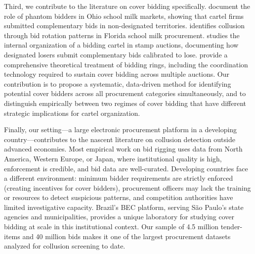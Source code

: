 Third, we contribute to the literature on cover bidding specifically. \citet{porter1999ohio} document the role of phantom bidders in Ohio school milk markets, showing that cartel firms submitted complementary bids in non-designated territories. \citet{pesendorfer2000study} identifies collusion through bid rotation patterns in Florida school milk procurement. \citet{asker2010leniency} studies the internal organization of a bidding cartel in stamp auctions, documenting how designated losers submit complementary bids calibrated to lose. \citet{marshall2012economics} provide a comprehensive theoretical treatment of bidding rings, including the coordination technology required to sustain cover bidding across multiple auctions. Our contribution is to propose a systematic, data-driven method for identifying potential cover bidders across all procurement categories simultaneously, and to distinguish empirically between two regimes of cover bidding that have different strategic implications for cartel organization.

Finally, our setting---a large electronic procurement platform in a developing country---contributes to the nascent literature on collusion detection outside advanced economies. Most empirical work on bid rigging uses data from North America, Western Europe, or Japan, where institutional quality is high, enforcement is credible, and bid data are well-curated. Developing countries face a different environment: minimum bidder requirements are strictly enforced (creating incentives for cover bidders), procurement officers may lack the training or resources to detect suspicious patterns, and competition authorities have limited investigative capacity. Brazil's BEC platform, serving S\~{a}o Paulo's state agencies and municipalities, provides a unique laboratory for studying cover bidding at scale in this institutional context. Our sample of 4.5 million tender-items and 40 million bids makes it one of the largest procurement datasets analyzed for collusion screening to date.

